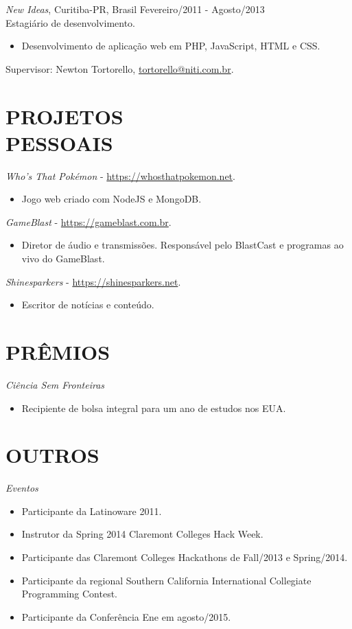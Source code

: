 \documentclass[margin]{res}
\begin{document}
\begin{resume}
			{\sl New Ideas}, Curitiba-PR, Brasil \hfill Fevereiro/2011 - Agosto/2013 \\
			Estagiário de desenvolvimento.
			\begin{itemize}
				\itemsep -2pt
		    	\item Desenvolvimento de aplicação web em PHP, JavaScript, HTML e CSS.
			\end{itemize}
			Supervisor: Newton Tortorello, \href{mailto:tortorello@niti.com.br}{tortorello@niti.com.br}.
			
		\section{PROJETOS \\ PESSOAIS}
			{\sl Who's That Pokémon} - \href{https://whosthatpokemon.net}{https://whosthatpokemon.net}.
			\begin{itemize}
				\item[] Jogo web criado com NodeJS e MongoDB.
			\end{itemize}
			{\sl GameBlast} - \href{https://gameblast.com.br}{https://gameblast.com.br}.
			\begin{itemize}
				\item[] Diretor de áudio e transmissões. Responsável pelo BlastCast e programas ao vivo do GameBlast.
			\end{itemize}
			{\sl Shinesparkers} - \href{https://shinesparkers.net}{https://shinesparkers.net}.
			\begin{itemize}
				\item[] Escritor de notícias e conteúdo.
			\end{itemize}
	
		\section{PRÊMIOS}
			{\sl Ciência Sem Fronteiras}
			\begin{itemize}
				\item[] Recipiente de bolsa integral para um ano de estudos nos EUA.
			\end{itemize}

		\section{OUTROS}
			{\sl Eventos}
			\begin{itemize}
				\item[] Participante da Latinoware 2011.
				\item[] Instrutor da Spring 2014 Claremont Colleges Hack Week.
				\item[] Participante das Claremont Colleges Hackathons de Fall/2013 e Spring/2014.
				\item[] Participante da regional Southern California International Collegiate Programming Contest.
				\item[] Participante da Conferência Ene em agosto/2015.
			\end{itemize}


\end{resume}
\end{document}
